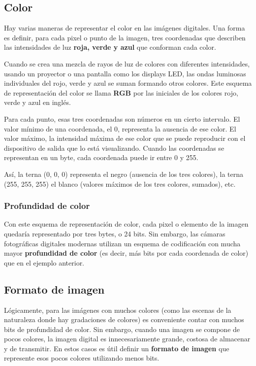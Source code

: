 \documentclass[spanish,A4,]{article}
\begin{document}
\subsection{Color}\label{color}

Hay varias maneras de representar el color en las imágenes digitales.
Una forma es definir, para cada pixel o punto de la imagen, tres
coordenadas que describen las intensidades de luz \textbf{roja, verde y
azul} que conforman cada color.

Cuando se crea una mezcla de rayos de luz de colores con diferentes
intensidades, usando un proyector o una pantalla como los displays LED,
las ondas luminosas individuales del rojo, verde y azul se suman
formando otros colores. Este esquema de representación del color se
llama \textbf{RGB} por las iniciales de los colores rojo, verde y azul
en inglés.

Para cada punto, esas tres coordenadas son números en un cierto
intervalo. El valor mínimo de una coordenada, el 0, representa la
ausencia de ese color. El valor máximo, la intensidad máxima de ese
color que se puede reproducir con el dispositivo de salida que lo está
visualizando. Cuando las coordenadas se representan en un byte, cada
coordenada puede ir entre 0 y 255.

Así, la terna (0, 0, 0) representa el negro (ausencia de los tres
colores), la terna (255, 255, 255) el blanco (valores máximos de los
tres colores, sumados), etc.

\subsubsection{Profundidad de color}\label{profundidad-de-color}

Con este esquema de representación de color, cada pixel o elemento de la
imagen quedaría representado por tres bytes, o 24 bits. Sin embargo, las
cámaras fotográficas digitales modernas utilizan un esquema de
codificación con mucha mayor \textbf{profundidad de color} (es decir,
más bits por cada coordenada de color) que en el ejemplo anterior.

\subsection{Formato de imagen}\label{formato-de-imagen}

Lógicamente, para las imágenes con muchos colores (como las escenas de
la naturaleza donde hay gradaciones de colores) es conveniente contar
con muchos bits de profundidad de color. Sin embargo, cuando una imagen
se compone de pocos colores, la imagen digital es innecesariamente
grande, costosa de almacenar y de transmitir. En estos casos es útil
definir un \textbf{formato de imagen} que represente esos pocos colores
utilizando menos bits.
\end{document}

